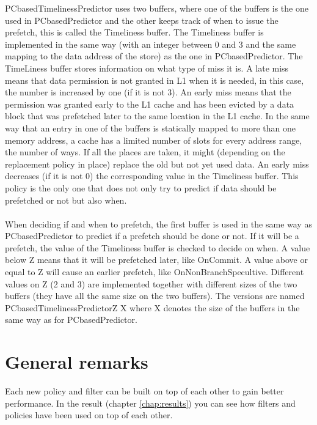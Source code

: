 PCbasedTimelinessPredictor uses two buffers, where one of the buffers is the one used
in PCbasedPredictor and the other keeps track of when to issue the prefetch, this is
called the Timeliness buffer. The Timeliness buffer is implemented in the same way
(with an integer between 0 and 3 and the same mapping to the data address of the
store) as the one in PCbasedPredictor. The TimeLiness buffer stores information on what
type of miss it is. A late miss means that data permission is not granted in L1 when
it is needed, in this case, the number is increased by one (if it is not 3). An early miss
means that the permission was granted early to the L1 cache and has been evicted by
a data block that was prefetched later to the same location in the L1 cache. In the
same way that an entry in one of the buffers is statically mapped to more than one
memory address, a cache has a limited number of slots for every address range, the
number of ways. If all the places are taken, it might (depending on the replacement
policy in place) replace the old but not yet used data. An early miss decreases (if it
is not 0) the corresponding value in the Timeliness buffer. This policy is the only one
that does not only try to predict if data should be prefetched or not but also when.
\\ \\
When deciding if and when to prefetch, the first buffer is used in the same way as
PCbasedPredictor to predict if a prefetch should be done or not. If it will be a prefetch,
the value of the Timeliness buffer is checked to decide on when. A value below Z
means that it will be prefetched later, like OnCommit. A value above or equal to Z
will cause an earlier prefetch, like OnNonBranchSpecultive. Different values on Z (2 and
3) are implemented together with different sizes of the two buffers (they have all the
same size on the two buffers). The versions are named PCbasedTimelinessPredictorZ
X where X denotes the size of the buffers in the same way as for PCbasedPredictor.

\section{General remarks}
Each new policy and filter can be built on top of each other to gain better performance. In the result (chapter \ref{chap:results}) you can see how filters and policies have been used on top of each other.
